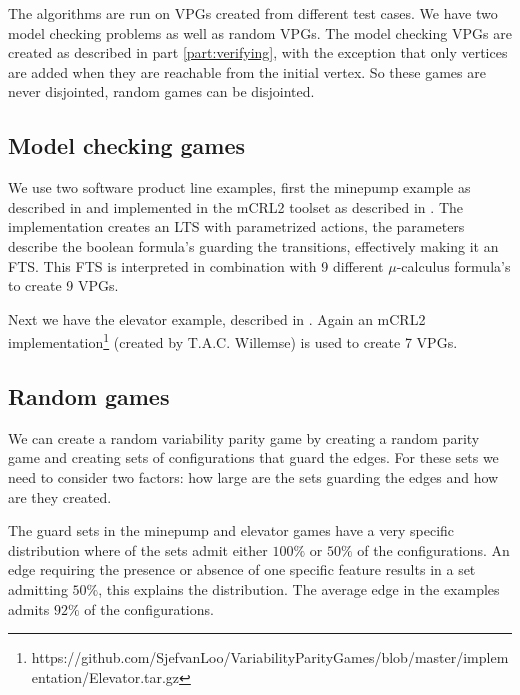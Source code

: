 The algorithms are run on VPGs created from different test cases. We have two model checking problems as well as random VPGs. The model checking VPGs are created as described in part \ref{part:verifying}, with the exception that only vertices are added when they are reachable from the initial vertex. So these games are never disjointed, random games can be disjointed.

\subsection{Model checking games}
We use two software product line examples, first the minepump example as described in \cite{Kramer1983CONICAI} and implemented in the mCRL2 toolset as described in \cite{FamBasedModelCheckingWithMCRL2}. The implementation creates an LTS with parametrized actions, the parameters describe the boolean formula's guarding the transitions, effectively making it an FTS. This FTS is interpreted in combination with 9 different $\mu$-calculus formula's to create 9 VPGs.

Next we have the elevator example, described in \cite{PLATH200153}. Again an mCRL2 implementation\footnote{\label{note1}https://github.com/SjefvanLoo/VariabilityParityGames/blob/master/implementation/Elevator.tar.gz} (created by T.A.C. Willemse) is used to create 7 VPGs.
\subsection{Random games}
We can create a random variability parity game by creating a random parity game and creating sets of configurations that guard the edges. For these sets we need to consider two factors: how large are the sets guarding the edges and how are they created.

The guard sets in the minepump and elevator games have a very specific distribution where of the sets admit either $100\%$ or $50\%$ of the configurations. An edge requiring the presence or absence of one specific feature results in a set admitting $50\%$, this explains the distribution. The average edge in the examples admits $92\%$ of the configurations. 

